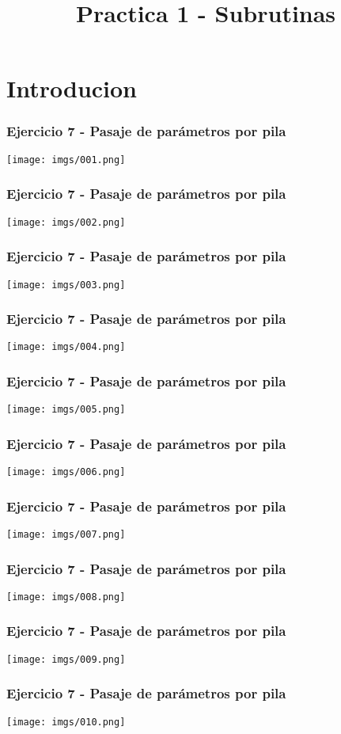 \documentclass{beamer}
\title{Practica 1 - Subrutinas}
\begin{document}
\begin{frame}
\titlepage
\end{frame}

\section{Introducion}

\begin{frame}
\frametitle{Ejercicio 7 - Pasaje de parámetros por pila}
\texttt{[image: imgs/001.png]}
\end{frame}

\begin{frame}
\frametitle{Ejercicio 7 - Pasaje de parámetros por pila}
\texttt{[image: imgs/002.png]}
\end{frame}

\begin{frame}
\frametitle{Ejercicio 7 - Pasaje de parámetros por pila}
\texttt{[image: imgs/003.png]}
\end{frame}

\begin{frame}
\frametitle{Ejercicio 7 - Pasaje de parámetros por pila}
\texttt{[image: imgs/004.png]}
\end{frame}

\begin{frame}
\frametitle{Ejercicio 7 - Pasaje de parámetros por pila}
\texttt{[image: imgs/005.png]}
\end{frame}

\begin{frame}
\frametitle{Ejercicio 7 - Pasaje de parámetros por pila}
\texttt{[image: imgs/006.png]}
\end{frame}
\begin{frame}
\frametitle{Ejercicio 7 - Pasaje de parámetros por pila}
\texttt{[image: imgs/007.png]}
\end{frame}
\begin{frame}
\frametitle{Ejercicio 7 - Pasaje de parámetros por pila}
\texttt{[image: imgs/008.png]}
\end{frame}
\begin{frame}
  \frametitle{Ejercicio 7 - Pasaje de parámetros por pila}
\texttt{[image: imgs/009.png]}
\end{frame}
\begin{frame}
\frametitle{Ejercicio 7 - Pasaje de parámetros por pila}
\texttt{[image: imgs/010.png]}
\end{frame}
\end{document}
